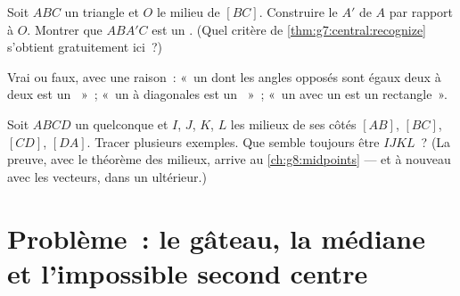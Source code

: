\begin{exercise}[$\star\star$]\label{exo:g7:central:9}
Soit $ABC$ un triangle et $O$ le milieu de $[BC]$. Construire le
 $A'$ de $A$ par rapport à $O$. Montrer que $ABA'C$ est un
. (Quel critère de \cref{thm:g7:central:recognize}
s'obtient gratuitement ici~?)
\end{exercise}

\begin{exercise}[$\star\star$]\label{exo:g7:central:10}
Vrai ou faux, avec une raison~: «~un  dont les angles
opposés sont égaux deux à deux est un ~»~; «~un
 à diagonales  est un ~»~; «~un
 avec un  est un rectangle~».
\end{exercise}

\begin{exercise}[$\star\star\star$]\label{exo:g7:central:11}
Soit $ABCD$ un  quelconque et $I$, $J$, $K$, $L$ les
milieux de ses côtés $[AB]$, $[BC]$, $[CD]$, $[DA]$. Tracer plusieurs
exemples. Que semble toujours être $IJKL$~? (La preuve, avec le
théorème des milieux, arrive au \cref{ch:g8:midpoints} --- et à
nouveau avec les vecteurs, dans un  ultérieur.)
\end{exercise}

\section{Problème~: le gâteau, la médiane et l'impossible second
centre}


